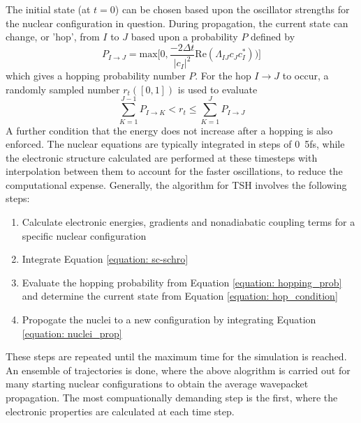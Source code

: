The initial state (at $t=0$) can be chosen based upon the oscillator strengths for the nuclear configuration in question. During propagation, the current state can change, or 'hop', from $I$ to $J$ based upon a probability $P$ defined by
\begin{equation}\label{equation: hopping_prob}
    P_{I\rightarrow{}J}=\mathrm{max}\bigg[0,\frac{-2\Delta{}t}{|c_{I}|^{2}}\mathrm{Re}(\Lambda_{IJ}c_{J}c_{I}^{\ast}))\bigg]
\end{equation}
which gives a hopping probability number $P$. For the hop $I\rightarrow{}J$ to occur, a randomly sampled number $r_{t}([0,1])$ is used to evaluate
\begin{equation}\label{equation: hop_condition}
    \sum_{K=1}^{J-1}P_{I\rightarrow{}K}<r_{t}\leq{}\sum_{K=1}^{J}P_{I\rightarrow{}J}
\end{equation}
A further condition that the energy does not increase after a hopping is also enforced. The nuclear equations are typically integrated in steps of \si{0.5}{fs}, while the electronic structure calculated are performed at these timesteps with interpolation between them to account for the faster oscillations, to reduce the computational expense. Generally, the algorithm for \ac{TSH} involves the following steps:
\begin{enumerate}
    \item Calculate electronic energies, gradients and nonadiabatic coupling terms for a specific nuclear configuration
    \item Integrate Equation \ref{equation: sc-schro}
    \item Evaluate the hopping probability from Equation \ref{equation: hopping_prob} and determine the current state from Equation \ref{equation: hop_condition}
    \item Propogate the nuclei to a new configuration by integrating Equation \ref{equation: nuclei_prop}
\end{enumerate}
These steps are repeated until the maximum time for the simulation is reached. An ensemble of trajectories is done, where the above alogrithm is carried out for many starting nuclear configurations to obtain the average wavepacket propagation. The most compuationally demanding step is the first, where the electronic properties are calculated at each time step. 


